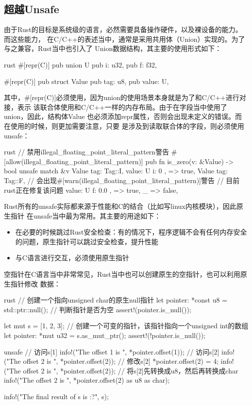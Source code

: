 \subsection{超越Unsafe}
由于Rust的目标是系统级的语言，必然需要具备操作硬件，以及裸设备的能力。而这些能力，
在C/C++的表述当中，通常是采用共用体（Union）实现的。为了与之兼容，Rust当中也引入了
Union数据结构，其主要的使用形式如下：
\begin{code-block}{rust}
#[repr(C)]
pub union U {
    pub i: u32,
    pub f: f32,
}

#[repr(C)]
pub struct Value {
    pub tag: u8,
    pub value: U,
}
\end{code-block}
其中，\#[repr(C)]必须使用，因为union的使用场景本身就是为了和C/C++进行对接，表示
该联合体使用和C/C++一样的内存布局。由于在字段当中使用了union，因此，结构体Value
也必须添加repr属性，否则会出现未定义的错误。而在使用的时候，则更加需要注意，只要
是涉及到读取联合体的字段，则必须使用unsafe：
\begin{code-block}{rust}
// 禁用illegal_floating_point_literal_pattern警告
#[allow(illegal_floating_point_literal_pattern)]
pub fn is_zero(v: &Value) -> bool {
    unsafe {
        match &v {
            Value {
                tag: Tag::I,
                value: U { i: 0 },
            } => true,
            Value {
                tag: Tag::F,
                // 会出现#[warn(illegal_floating_point_literal_pattern)]警告
                // 目前rust正在修复该问题
                value: U { f: 0.0 },
            } => true,
            _ => false,
        }
    }
}
\end{code-block}

Rust所有的unsafe实际都来源于性能和C的结合（比如写linux内核模块），因此原生指针
在unsafe当中最为常用。其主要的用途如下：
\begin{itemize}
  \item 在必要的时候跳过Rust安全检查：有的情况下，程序逻辑不会有任何内存安全的问题，原生指针可以跳过安全检查，提升性能
  \item 与C语言进行交互，必须使用原生指针
\end{itemize}

空指针在C语言当中非常常见，Rust当中也可以创建原生的空指针，也可以利用原生指针修改
数据：
\begin{code-block}{rust}
// 创建一个指向unsigned char的原生null指针
let pointer: *const u8 = std::ptr::null();
// 判断指针是否为空
assert!(pointer.is_null());

let mut s = [1, 2, 3];
// 创建一个可变的指针，该指针指向一个unsigned int的数组
let pointer: *mut u32 = s.as_mut_ptr();
assert!(!pointer.is_null());

unsafe {
    // 访问s[1]
    info!("The offset 1 is {}", *pointer.offset(1));
    // 访问s[2]
    info!("The offset 2 is {}", *pointer.offset(2));
    // 修改s[2]
    *pointer.offset(2) = 4;
    info!("The offset 2 is {}", *pointer.offset(2));
    // 将s[2]先转换成u8，然后再转换成char
    info!("The offset 2 is {}", *pointer.offset(2) as u8 as char);
}

info!("The final result of s is {:?}", s);
\end{code-block}

